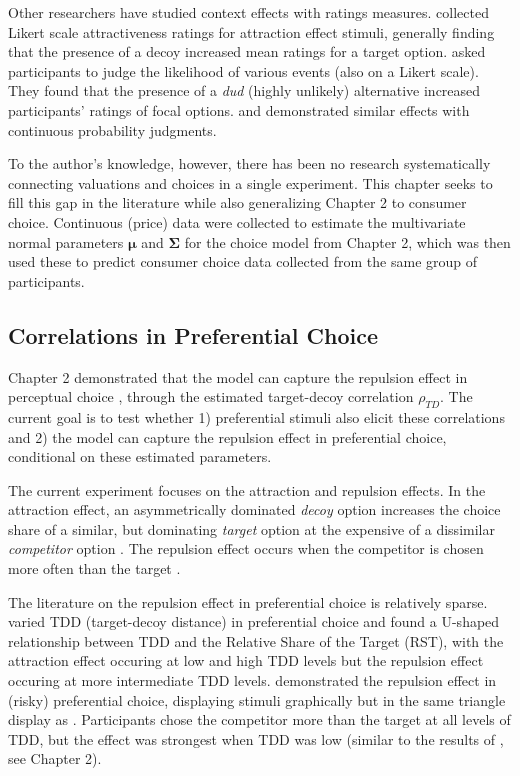 Other researchers have studied context effects with ratings measures. \textcite{wedellUsingJudgmentsUnderstand} collected Likert scale attractiveness ratings for attraction effect stimuli, generally finding that the presence of a decoy increased mean ratings for a target option. \textcite{windschitl2004dud} asked participants to judge the likelihood of various events (also on a Likert scale). They found that the presence of a \textit{dud} (highly unlikely) alternative increased participants' ratings of focal options. \textcite{caiWhenAlternativeHypotheses2023} and \textcite{fang2024context} demonstrated similar effects with continuous probability judgments.

To the author's knowledge, however, there has been no research systematically connecting valuations and choices in a single experiment. This chapter seeks to fill this gap in the literature while also generalizing Chapter 2 to consumer choice. Continuous (price) data were collected to estimate the multivariate normal parameters $\boldsymbol{\mu}$ and $\boldsymbol{\Sigma}$ for the choice model from Chapter 2, which was then used these to predict consumer choice data collected from the same group of participants.

\subsection{Correlations in Preferential Choice}
Chapter 2 demonstrated that the model can capture the repulsion effect in perceptual choice \parencite{spektorWhenGoodLooks2018b}, through the estimated target-decoy correlation $\rho_{TD}$. The current goal is to test whether 1) preferential stimuli also elicit these correlations and 2) the model can capture the repulsion effect in preferential choice, conditional on these estimated parameters. 

The current experiment focuses on the attraction and repulsion effects. In the attraction effect, an asymmetrically dominated \textit{decoy} option increases the choice share of a similar, but dominating \textit{target} option at the expensive of a dissimilar \textit{competitor} option \parencite{huberAddingAsymmetricallyDominated1982d}. The repulsion effect occurs when the competitor is chosen more often than the target \parencite{simonson2014vices}. 

The literature on the repulsion effect in preferential choice is relatively sparse. \textcite{liaoInfluenceDistanceDecoy2021} varied TDD (target-decoy distance) in preferential choice and found a U-shaped relationship between TDD and the Relative Share of the Target (RST), with the attraction effect occuring at low and high TDD levels but the repulsion effect occuring at more intermediate TDD levels. \textcite{spektorRepulsionEffectPreferential2022} demonstrated the repulsion effect in (risky) preferential choice, displaying stimuli graphically but in the same triangle display as \textcite{spektorWhenGoodLooks2018b}. Participants chose the competitor more than the target at all levels of TDD, but the effect was strongest when TDD was low (similar to the results of \textcite{spektorWhenGoodLooks2018b}, see Chapter 2). 



